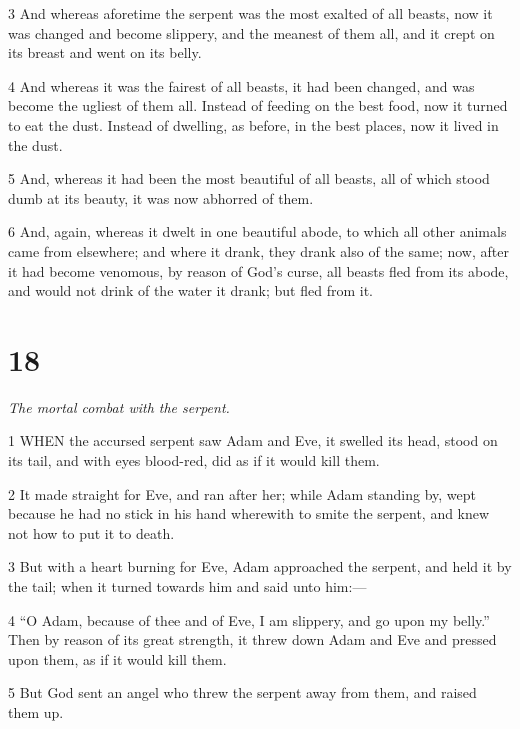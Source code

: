 \par 3 And whereas aforetime the serpent was the most exalted of all beasts, now it was changed and become slippery, and the meanest of them all, and it crept on its breast and went on its belly.

\par 4 And whereas it was the fairest of all beasts, it had been changed, and was become the ugliest of them all. Instead of feeding on the best food, now it turned to eat the dust. Instead of dwelling, as before, in the best places, now it lived in the dust.

\par 5 And, whereas it had been the most beautiful of all beasts, all of which stood dumb at its beauty, it was now abhorred of them.

\par 6 And, again, whereas it dwelt in one beautiful abode, to which all other animals came from elsewhere; and where it drank, they drank also of the same; now, after it had become venomous, by reason of God's curse, all beasts fled from its abode, and would not drink of the water it drank; but fled from it.

\chapter{18}

\par \textit{The mortal combat with the serpent.}

\par 1 WHEN the accursed serpent saw Adam and Eve, it swelled its head, stood on its tail, and with eyes blood-red, did as if it would kill them.

\par 2 It made straight for Eve, and ran after her; while Adam standing by, wept because he had no stick in his hand wherewith to smite the serpent, and knew not how to put it to death.

\par 3 But with a heart burning for Eve, Adam approached the serpent, and held it by the tail; when it turned towards him and said unto him:—

\par 4 “O Adam, because of thee and of Eve, I am slippery, and go upon my belly.” Then by reason of its great strength, it threw down Adam and Eve and pressed upon them, as if it would kill them.

\par 5 But God sent an angel who threw the serpent away from them, and raised them up.

